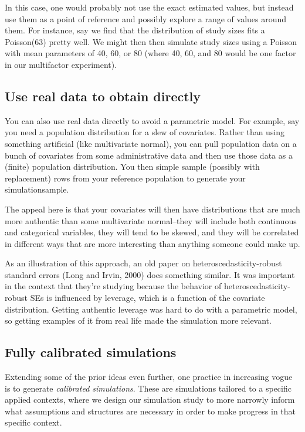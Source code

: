 \documentclass[
]{book}
\begin{document}
In this case, one would probably not use the exact estimated values, but instead use them as a point of reference and possibly explore a range of values around them.
For instance, say we find that the distribution of study sizes fits a Poisson(63) pretty well.
We might then then simulate study sizes using a Poisson with mean parameters of 40, 60, or 80 (where 40, 60, and 80 would be one factor in our multifactor experiment).

\subsection{Use real data to obtain directly}\label{use-real-data-to-obtain-directly}

You can also use real data directly to avoid a parametric model.
For example, say you need a population distribution for a slew of covariates.
Rather than using something artificial (like multivariate normal), you can pull population data on a bunch of covariates from some administrative data and then use those data as a (finite) population distribution.
You then simple sample (possibly with replacement) rows from your reference population to generate your simulationsample.

The appeal here is that your covariates will then have distributions that are much more authentic than some multivariate normal--they will include both continuous and categorical variables, they will tend to be skewed, and they will be correlated in different ways that are more interesting than anything someone could make up.

As an illustration of this approach, an old paper on heteroscedasticity-robust standard errors (Long and Irvin, 2000) does something similar.
It was important in the context that they're studying because the behavior of heteroscedasticity-robust SEs is influenced by leverage, which is a function of the covariate distribution.
Getting authentic leverage was hard to do with a parametric model, so getting examples of it from real life made the simulation more relevant.

\subsection{Fully calibrated simulations}\label{fully-calibrated-simulations}

Extending some of the prior ideas even further, one practice in increasing vogue is to generate \emph{calibrated simulations}.
These are simulations tailored to a specific applied contexts, where we design our simulation study to more narrowly inform what assumptions and structures are necessary in order to make progress in that specific context.
\end{document}
